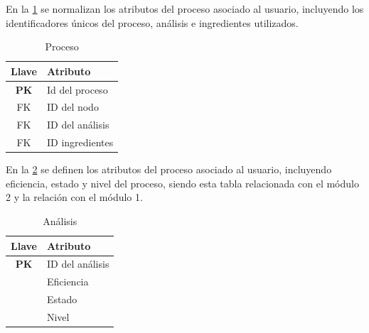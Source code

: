 En la \cref{tab:Proceso} se normalizan los atributos del proceso asociado al usuario,
incluyendo los identificadores únicos del proceso, análisis e ingredientes utilizados.

\begin{table}[H]
    \centering
    \caption{Proceso}%
    \label{tab:Proceso}
    \footnotesize %

    \begin{tabular}{|c|>{\raggedright\arraybackslash}p{2.5cm}|}
        \hline
        \textbf{Llave}       & \textbf{Atributo}    \\ \hline
         \textbf{PK} & Id del proceso               \\ \hline
        FK & ID del nodo                                  \\ \hline
        FK & ID del análisis                                  \\ \hline
        FK & ID ingredientes                                   \\ \hline 
    \end{tabular}
\end{table}

En la \cref{tab:Analisis} se definen los atributos del proceso asociado al usuario,
incluyendo eficiencia, estado y nivel del proceso, siendo esta tabla relacionada con
el módulo 2 y la relación con el módulo 1.

\begin{table}[H]
    \centering
    \caption{Análisis}%
    \label{tab:Analisis}
    \footnotesize %

    \begin{tabular}{|c|>{\raggedright\arraybackslash}p{2.5cm}|}
        \hline
        \textbf{Llave}       & \textbf{Atributo}    \\ \hline
       \textbf{PK}  & ID del análisis                   \\ \hline
        & Eficiencia                                       \\ \hline
        & Estado                                           \\ \hline
        & Nivel                                            \\ \hline
    \end{tabular}
\end{table}

